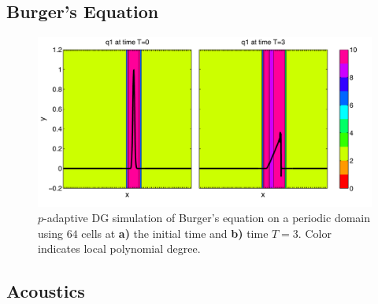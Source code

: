 \documentclass[10]{amsart}
\begin{document}
\subsection{Burger's Equation}
\begin{figure}
\hfil\includegraphics[width=5in]{figures/burgers_heat.pdf}\hfil
\caption{$p$-adaptive DG simulation of Burger's equation on a periodic domain using $64$ cells at {\bf a)} the initial time and {\bf b)} time $T=3$. Color indicates local polynomial degree. }
\label{burgersGaussian}
\end{figure}
\subsection{Acoustics}





\end{document}
